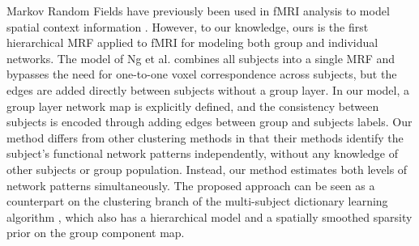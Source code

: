 \documentclass[runningheads,a4paper]{llncs}
\begin{document}
Markov Random Fields have previously been used in fMRI analysis to model spatial
context information \cite{descombes1998spatio,liu2010spatial}. However, to our
knowledge, ours is the first hierarchical MRF applied to fMRI for modeling both
group and individual networks. The model of Ng et al. \cite{ng2010group}
combines all subjects into a single MRF and bypasses the need for one-to-one
voxel correspondence across subjects, but the edges are added directly between
subjects without a group layer. In our model, a group layer network map is
explicitly defined, and the consistency between subjects is encoded through
adding edges between group and subjects labels. Our method differs from other
clustering methods \cite{bellec2010multi,van2008normalized} in that their
methods identify the subject's functional network patterns independently,
without any knowledge of other subjects or group population. Instead, our method
estimates both levels of network patterns simultaneously.  The proposed approach
can be seen as a counterpart on the clustering branch of the multi-subject
dictionary learning algorithm \cite{varoquaux2011multi}, which also has a
hierarchical model and a spatially smoothed sparsity prior on the group
component map.


\end{document}
